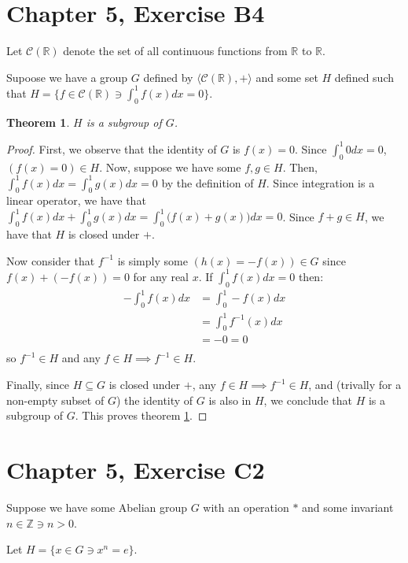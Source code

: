\documentclass[12pt]{article}
\newcommand{\reals}{\mathbb{R}}
\newcommand{\ints}{\mathbb{Z}}
\newcommand{\contreals}{\mathcal{C}(\reals)}
\newtheorem{thm}{Theorem}
\begin{document}
\section{Chapter 5, Exercise B4}

Let $\contreals$ denote the set of all continuous functions from $\reals$ to $\reals$.

Supoose we have a group $G$ defined by $\langle \contreals, + \rangle$
and some set $H$ defined such that
$H = \{ f \in \contreals \ni \int_0^1 f(x)dx = 0 \}$.

\begin{thm} \label{thm:8}
	$H$ is a subgroup of $G$.
\end{thm}

\begin{proof}
	First, we observe that the identity of $G$ is $f(x) = 0$.
	Since $\int_0^1 0 dx = 0$, $(f(x) = 0) \in H$.
	Now, suppose we have some $f,g \in H$.
	Then, $\int_0^1 f(x)dx = \int_0^1 g(x)dx = 0$
	by the definition of $H$.
	Since integration is a linear operator, we have that
	$\int_0^1 f(x)dx + \int_0^1 g(x)dx = \int_0^1 \big(f(x) + g(x)\big)dx = 0$.
	Since $f + g \in H$, we have that $H$ is closed under $+$.

	Now consider that $f^{-1}$ is simply some $(h(x) = -f(x)) \in G$
	since $f(x) + (-f(x)) = 0$ for any real $x$.
	If $\int_0^1 f(x)dx = 0$
	then:
	\begin{align}
		-\int_0^1 f(x)dx & = \int_0^1 -f(x)dx  \\
				 & = \int_0^1 f^{-1}(x) dx  \\
				 & = -0 = 0 \\
	\end{align}
	so $f^{-1} \in H$ and any $f \in H \implies f^{-1} \in H$.

	Finally, since $H \subseteq G$ is closed under $+$,
	any $f \in H \implies f^{-1} \in H$,
	and (trivally for a non-empty subset of $G$)
	the identity of $G$ is also in $H$,
	we conclude that $H$ is a subgroup of $G$.
	This proves theorem \ref{thm:8}.
\end{proof}


\section{Chapter 5, Exercise C2}

Suppose we have some Abelian group $G$
with an operation $*$
and some invariant $n \in \ints \ni n > 0$.

Let $H = \{ x \in G \ni x^n = e \}$.
\end{document}
